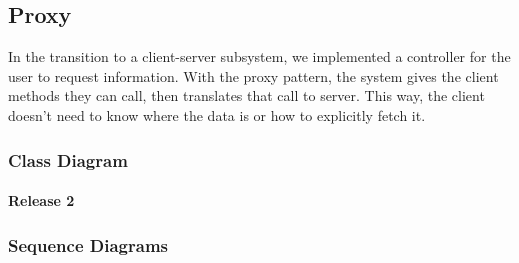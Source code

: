 \newpage

\subsection{Proxy}\label{subsec:proxy}

\indent
In the transition to a client-server subsystem, we implemented a controller for the user to request information.
With the proxy pattern, the system gives the client methods they can call, then translates that call to server.
This way, the client doesn’t need to know where the data is or how to explicitly fetch it.

\subsubsection{Class Diagram}

\paragraph{Release 2}

\begin{center}
\end{center}

\newpage

\subsubsection{Sequence Diagrams}

